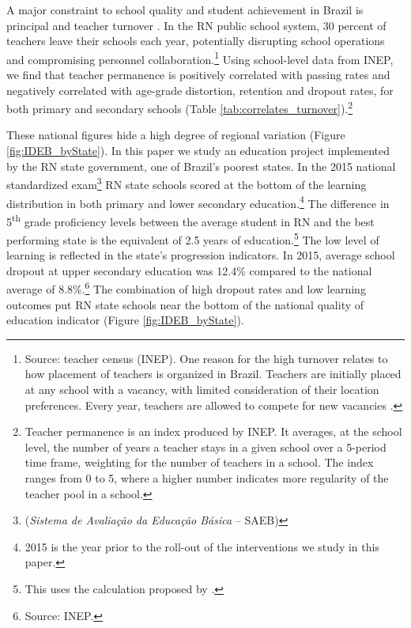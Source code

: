 \documentclass[11pt,a4paper]{article}
\begin{document}
A major constraint to school quality and student achievement in Brazil is principal and teacher turnover \citep{akhtari2018political}. In the RN public school system, 30 percent of teachers leave their schools each year, potentially disrupting school operations and compromising personnel collaboration.\footnote{Source: teacher census (INEP). One reason for the high turnover relates to how placement of teachers is organized in Brazil. Teachers are initially placed at any school with a vacancy, with limited consideration of their location preferences. Every year, teachers are allowed to compete for new vacancies \citep{akhtari2018political}.} Using school-level data from INEP, we find that teacher permanence is positively correlated with passing rates and negatively correlated with age-grade distortion, retention and dropout rates, for both primary and secondary schools (Table \ref{tab:correlates_turnover}).\footnote{Teacher permanence is an index produced by INEP. It averages, at the school level, the number of years a teacher stays in a given school over a 5-period time frame, weighting for the number of teachers in a school. The index ranges from 0 to 5, where a higher number indicates more regularity of the teacher pool in a school.}

These national figures hide a high degree of regional variation (Figure \ref{fig:IDEB_byState}). In this paper we study an education project implemented by the RN state government, one of Brazil's poorest states. In the 2015 national standardized exam\footnote{(\textit{Sistema de Avaliação da Educação Básica} -- SAEB)} RN state schools scored at the bottom of the learning distribution in both primary and lower secondary education.\footnote{2015 is the year prior to the roll-out of the interventions we study in this paper.} The difference in 5\textsuperscript{th} grade proficiency levels between the average student in RN and the best performing state is the equivalent of 2.5 years of education.\footnote{This uses the calculation proposed by \cite{alves2016desigualdades}.} The low level of learning is reflected in the state's progression indicators. In 2015, average school dropout at upper secondary education was 12.4\% compared to the national average of 8.8\%.\footnote{Source: INEP.} The combination of high dropout rates and low learning outcomes put RN state schools near the bottom of the national quality of education indicator (Figure \ref{fig:IDEB_byState}). 

\end{document}

